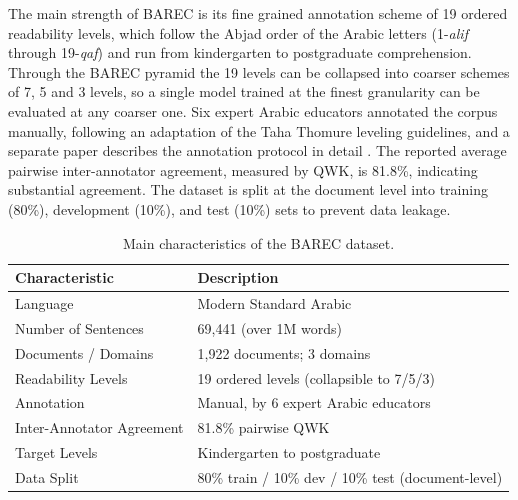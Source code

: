 \documentclass[12pt]{report}
\begin{document}
The main strength of BAREC is its fine grained annotation scheme of 19 ordered readability levels, which follow the Abjad order of the Arabic letters (1-\textit{alif} through 19-\textit{qaf}) and run from kindergarten to postgraduate comprehension. Through the BAREC pyramid the 19 levels can be collapsed into coarser schemes of 7, 5 and 3 levels, so a single model trained at the finest granularity can be evaluated at any coarser one. Six expert Arabic educators annotated the corpus manually, following an adaptation of the Taha Thomure leveling guidelines, and a separate paper describes the annotation protocol in detail \cite{habash2025guidelines}. The reported average pairwise inter-annotator agreement, measured by QWK, is 81.8\%, indicating substantial agreement. The dataset is split at the document level into training (80\%), development (10\%), and test (10\%) sets to prevent data leakage.

\begin{table}[H]

\centering

\caption{Main characteristics of the BAREC dataset.}

\label{tab:barec_characteristics}

\begin{tabular}{p{5cm} p{6cm}}

\toprule

\textbf{Characteristic} & \textbf{Description} \\

\midrule

Language & Modern Standard Arabic \\

Number of Sentences & 69,441 (over 1M words) \\

Documents / Domains & 1,922 documents; 3 domains \\

Readability Levels & 19 ordered levels (collapsible to 7/5/3) \\

Annotation & Manual, by 6 expert Arabic educators \\

Inter-Annotator Agreement & 81.8\% pairwise QWK \\

Target Levels & Kindergarten to postgraduate \\

Data Split & 80\% train / 10\% dev / 10\% test (document-level) \\

\bottomrule

\end{tabular}

\end{table}
\end{document}
